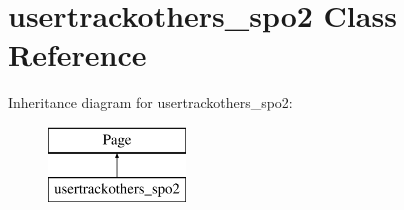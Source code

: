 \hypertarget{classusertrackothers__spo2}{\section{usertrackothers\-\_\-spo2 Class Reference}
\label{classusertrackothers__spo2}
}
Inheritance diagram for usertrackothers\-\_\-spo2\-:\begin{figure}[H]
\begin{center}
\leavevmode
\includegraphics[height=2.000000cm]{classusertrackothers__spo2}
\end{center}
\end{figure}
